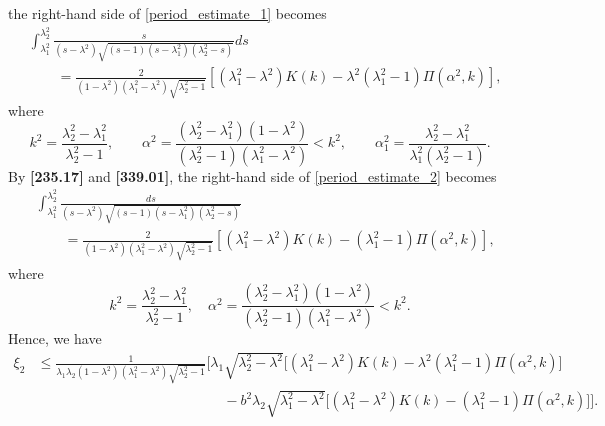 \documentclass[11pt]{amsart}
\numberwithin{equation}{section}
\numberwithin{figure}{section}
\theoremstyle{plain} %
\theoremstyle{definition} %
\begin{document}
the right-hand side of \eqref{period_estimate_1} becomes 
\begin{align*}
&\int_{\lambda_1^2}^{\lambda_2^2} \frac{s}{(s-\lambda^2)\sqrt{(s-1)(s-\lambda_1^2)(\lambda_2^2-s)}}ds \\
&\qquad =\frac{2}{(1-\lambda^2)(\lambda_1^2-\lambda^2)\sqrt{\lambda_2^2-1}}
[ (\lambda_1^2-\lambda^2) K(k) - \lambda^2 (\lambda_1^2-1) \Pi (\alpha^2,k)], 
\end{align*}
where 
\[
k^2 = \frac{\lambda_2^2-\lambda_1^2}{\lambda_2^2-1}, \qquad 
\alpha^2 = \frac{(\lambda_2^2-\lambda_1^2)(1-\lambda^2)}{(\lambda_2^2-1)(\lambda_1^2-\lambda^2)} < k^2, \qquad
\alpha_1^2 = \frac{\lambda_2^2-\lambda_1^2}{\lambda_1^2(\lambda_2^2-1)}. 
\]
By \textbf{[235.17]} 
and \textbf{[339.01]}, %
the right-hand side of \eqref{period_estimate_2} becomes 
\begin{align*}
&\int_{\lambda_1^2}^{\lambda_2^2} \frac{ds}{(s-\lambda^2)\sqrt{(s-1)(s-\lambda_1^2)(\lambda_2^2-s)}} \\
&\qquad =\frac{2}{(1-\lambda^2)(\lambda_1^2-\lambda^2)\sqrt{\lambda_2^2-1}}
[ (\lambda_1^2-\lambda^2) K(k) - (\lambda_1^2-1) \Pi (\alpha^2,k)], 
\end{align*}
where 
\[
k^2 = \frac{\lambda_2^2-\lambda_1^2}{\lambda_2^2-1}, \quad 
\alpha^2 = \frac{(\lambda_2^2-\lambda_1^2)(1-\lambda^2)}{(\lambda_2^2-1)(\lambda_1^2-\lambda^2)} < k^2. 
\]
Hence, we have 
\begin{align*}
\xi_2 &\leq \frac{1}{\lambda_1 \lambda_2 (1-\lambda^2)(\lambda_1^2-\lambda^2)\sqrt{\lambda_2^2-1}} 
 \bigg[ \lambda_1\sqrt{\lambda_2^2-\lambda^2} \bigg[(\lambda_1^2-\lambda^2) K(k) - \lambda^2 (\lambda_1^2-1) \Pi (\alpha^2,k) \bigg] \\
&\hspace{160pt} - b^2 \lambda_2\sqrt{\lambda_1^2-\lambda^2} \bigg[(\lambda_1^2-\lambda^2) K(k) - (\lambda_1^2-1) \Pi (\alpha^2,k) \bigg] \bigg]. 
\end{align*}
\end{document}
